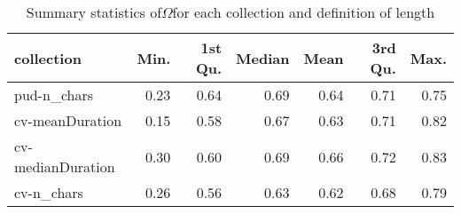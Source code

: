\begin{table}[H]
\centering
\caption{Summary statistics of$\Omega$for each collection and definition of length} 
\label{tab:opt_scores_summary_omega}
\begin{tabular}{lrrrrrr}
  \hline
collection & Min. & 1st Qu. & Median & Mean & 3rd Qu. & Max. \\ 
  \hline
pud-n_chars & 0.23 & 0.64 & 0.69 & 0.64 & 0.71 & 0.75 \\ 
  cv-meanDuration & 0.15 & 0.58 & 0.67 & 0.63 & 0.71 & 0.82 \\ 
  cv-medianDuration & 0.30 & 0.60 & 0.69 & 0.66 & 0.72 & 0.83 \\ 
  cv-n_chars & 0.26 & 0.56 & 0.63 & 0.62 & 0.68 & 0.79 \\ 
   \hline
\end{tabular}
\end{table}
